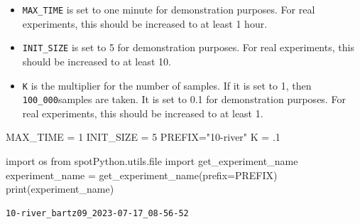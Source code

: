 \documentclass[
  letterpaper,
  DIV=11,
  numbers=noendperiod]{scrreprt}
\newenvironment{Shaded}{\begin{snugshade}}{\end{snugshade}}
\newcommand{\BuiltInTok}[1]{\textcolor[rgb]{0.00,0.23,0.31}{#1}}
\newcommand{\DecValTok}[1]{\textcolor[rgb]{0.68,0.00,0.00}{#1}}
\newcommand{\FloatTok}[1]{\textcolor[rgb]{0.68,0.00,0.00}{#1}}
\newcommand{\ImportTok}[1]{\textcolor[rgb]{0.00,0.46,0.62}{#1}}
\newcommand{\NormalTok}[1]{\textcolor[rgb]{0.00,0.23,0.31}{#1}}
\newcommand{\OperatorTok}[1]{\textcolor[rgb]{0.37,0.37,0.37}{#1}}
\newcommand{\StringTok}[1]{\textcolor[rgb]{0.13,0.47,0.30}{#1}}
\providecommand{\tightlist}{%
  \setlength{\itemsep}{0pt}\setlength{\parskip}{0pt}}\usepackage{longtable,booktabs,array}
\begin{document}
\begin{tcolorbox}[enhanced jigsaw, left=2mm, title=\textcolor{quarto-callout-caution-color}{\faFire}\hspace{0.5em}{Caution: Run time and initial design size should be increased for real
experiments}, bottomrule=.15mm, titlerule=0mm, breakable, rightrule=.15mm, toprule=.15mm, coltitle=black, colbacktitle=quarto-callout-caution-color!10!white, leftrule=.75mm, arc=.35mm, colframe=quarto-callout-caution-color-frame, bottomtitle=1mm, colback=white, opacitybacktitle=0.6, toptitle=1mm, opacityback=0]

\begin{itemize}
\tightlist
\item
  \texttt{MAX\_TIME} is set to one minute for demonstration purposes.
  For real experiments, this should be increased to at least 1 hour.
\item
  \texttt{INIT\_SIZE} is set to 5 for demonstration purposes. For real
  experiments, this should be increased to at least 10.
\item
  \texttt{K} is the multiplier for the number of samples. If it is set
  to 1, then \texttt{100\_000}samples are taken. It is set to 0.1 for
  demonstration purposes. For real experiments, this should be increased
  to at least 1.
\end{itemize}

\end{tcolorbox}

\begin{Shaded}
\begin{Highlighting}[]
\NormalTok{MAX\_TIME }\OperatorTok{=} \DecValTok{1}
\NormalTok{INIT\_SIZE }\OperatorTok{=} \DecValTok{5}
\NormalTok{PREFIX}\OperatorTok{=}\StringTok{"10{-}river"}
\NormalTok{K }\OperatorTok{=} \FloatTok{.1}
\end{Highlighting}
\end{Shaded}

\begin{Shaded}
\begin{Highlighting}[]
\ImportTok{import}\NormalTok{ os}
\ImportTok{from}\NormalTok{ spotPython.utils.}\BuiltInTok{file} \ImportTok{import}\NormalTok{ get\_experiment\_name}
\NormalTok{experiment\_name }\OperatorTok{=}\NormalTok{ get\_experiment\_name(prefix}\OperatorTok{=}\NormalTok{PREFIX)}
\BuiltInTok{print}\NormalTok{(experiment\_name)}
\end{Highlighting}
\end{Shaded}

\begin{verbatim}
10-river_bartz09_2023-07-17_08-56-52
\end{verbatim}
\end{document}
